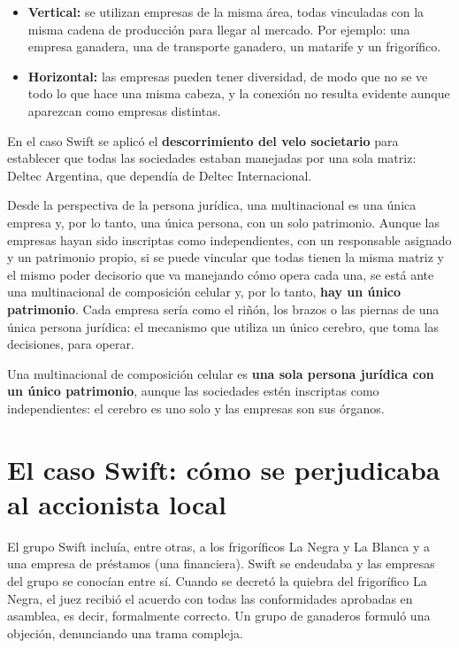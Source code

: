 \documentclass[12pt,oneside]{book}
\begin{document}
\begin{itemize}
    \item \textbf{Vertical:} se utilizan empresas de la misma área, todas vinculadas con la misma cadena de producción para llegar al mercado. Por ejemplo: una empresa ganadera, una de transporte ganadero, un matarife y un frigorífico.
    \item \textbf{Horizontal:} las empresas pueden tener diversidad, de modo que no se ve todo lo que hace una misma cabeza, y la conexión no resulta evidente aunque aparezcan como empresas distintas.
\end{itemize}

En el caso Swift se aplicó el \textbf{descorrimiento del velo societario} para establecer que todas las sociedades estaban manejadas por una sola matriz: Deltec Argentina, que dependía de Deltec Internacional.

Desde la perspectiva de la persona jurídica, una multinacional es una única empresa y, por lo tanto, una única persona, con un solo patrimonio. Aunque las empresas hayan sido inscriptas como independientes, con un responsable asignado y un patrimonio propio, si se puede vincular que todas tienen la misma matriz y el mismo poder decisorio que va manejando cómo opera cada una, se está ante una multinacional de composición celular y, por lo tanto, \textbf{hay un único patrimonio}. Cada empresa sería como el riñón, los brazos o las piernas de una única persona jurídica: el mecanismo que utiliza un único cerebro, que toma las decisiones, para operar.

\begin{important}
Una multinacional de composición celular es \textbf{una sola persona jurídica con un único patrimonio}, aunque las sociedades estén inscriptas como independientes: el cerebro es uno solo y las empresas son sus órganos.
\end{important}

\section{El caso Swift: cómo se perjudicaba al accionista local}

El grupo Swift incluía, entre otras, a los frigoríficos La Negra y La Blanca y a una empresa de préstamos (una financiera). Swift se endeudaba y las empresas del grupo se conocían entre sí. Cuando se decretó la quiebra del frigorífico La Negra, el juez recibió el acuerdo con todas las conformidades aprobadas en asamblea, es decir, formalmente correcto. Un grupo de ganaderos formuló una objeción, denunciando una trama compleja.
\end{document}
